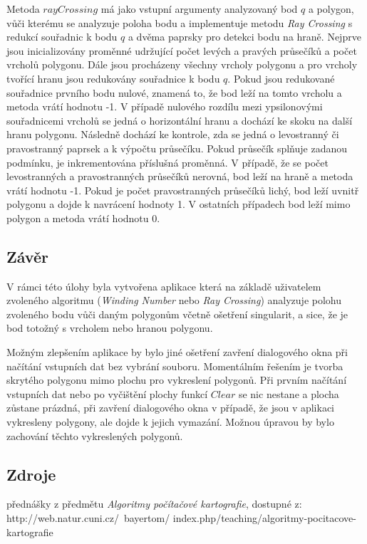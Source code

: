 \documentclass[15pt]{article}
\begin{document}
\begin{spacing}{1.5}
\noindent Metoda $rayCrossing$ má jako vstupní argumenty analyzovaný bod $q$ a polygon, vůči kterému se analyzuje poloha bodu a implementuje metodu \textit{Ray Crossing} s redukcí souřadnic k bodu $q$ a dvěma paprsky pro detekci bodu na hraně. Nejprve jsou inicializovány proměnné udržující počet levých a pravých průsečíků a počet vrcholů polygonu. Dále jsou procházeny všechny vrcholy polygonu a pro vrcholy tvořící hranu jsou redukovány souřadnice k bodu $q$. Pokud jsou redukované souřadnice prvního bodu nulové, znamená to, že bod leží na tomto vrcholu a metoda vrátí hodnotu -1. V případě nulového rozdílu mezi ypsilonovými souřadnicemi vrcholů se jedná o horizontální hranu a dochází ke skoku na další hranu polygonu. Následně dochází ke kontrole, zda se jedná o levostranný či pravostranný paprsek a k výpočtu průsečíku. Pokud průsečík splňuje zadanou podmínku, je inkrementována příslušná proměnná. V případě, že se počet levostranných a pravostranných průsečíků nerovná, bod leží na hraně a metoda vrátí hodnotu -1. Pokud je počet pravostranných průsečíků lichý, bod leží uvnitř polygonu a dojde k navrácení hodnoty 1. V ostatních případech bod leží mimo polygon a metoda vrátí hodnotu 0.

\subsection*{Závěr}
V rámci této úlohy byla vytvořena aplikace která na základě uživatelem zvoleného algoritmu (\textit{Winding Number} nebo \textit{Ray Crossing}) analyzuje polohu zvoleného bodu vůči daným polygonům včetně ošetření singularit, a sice, že je bod totožný s vrcholem nebo hranou polygonu. 

Možným zlepšením aplikace by bylo jiné ošetření zavření dialogového okna při načítání vstupních dat bez vybrání souboru. Momentálním řešením je tvorba skrytého polygonu mimo plochu pro vykreslení polygonů. Při prvním načítání vstupních dat nebo po vyčištění plochy funkcí $Clear$ se nic nestane a plocha zůstane prázdná, při zavření dialogového okna v případě, že jsou v aplikaci vykresleny polygony, ale dojde k jejich vymazání. Možnou úpravou by bylo zachování těchto vykreslených polygonů.

\newpage
\subsection*{Zdroje}

\noindent přednášky z předmětu \textit{Algoritmy počítačové kartografie}, dostupné z: http://web.natur.cuni.cz/~bayertom/
\noindent index.php/teaching/algoritmy-pocitacove-kartografie 


\end{spacing}
\end{document}
